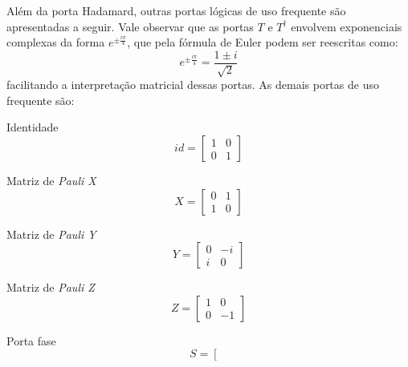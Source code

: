 Além da porta Hadamard, outras portas lógicas de uso frequente são apresentadas a seguir. Vale observar que as portas $T$ e $T^{\dagger}$ envolvem exponenciais complexas da forma $e^{\pm\frac{i\pi}{4}}$, que pela fórmula de Euler podem ser reescritas como:
    $$
        e^{\pm\frac{i\pi}{4}} = \dfrac{1\pm i}{\sqrt{2}}
    $$
\noindent facilitando a interpretação matricial dessas portas. As demais portas de uso frequente são:
    \begin{enumerate}
    \begin{minipage}{0.5\textwidth}
        \item Identidade
        $$
            id=\left[\begin{array}{cc}
                 1 & 0 \\
                 0 & 1
            \end{array}\right]
        $$
    \end{minipage}
    \begin{minipage}{0.5\textwidth}
        \item Matriz de \textit{Pauli X}
        $$
            X=\left[\begin{array}{cc}
                 0 & 1 \\
                 1 & 0
            \end{array}\right]
        $$
    \end{minipage}
    \begin{minipage}{0.5\textwidth}
        \item Matriz de \textit{Pauli Y}
        $$
            Y=\left[\begin{array}{cc}
                 0 & -i \\
                 i & 0
            \end{array}\right]
        $$
    \end{minipage}
    \begin{minipage}{0.5\textwidth}
        \item Matriz de \textit{Pauli Z}
        $$
            Z=\left[\begin{array}{cc}
                 1 & 0 \\
                 0 & -1
            \end{array}\right]
        $$
    \end{minipage}
    \begin{minipage}{0.5\textwidth}
        \item Porta fase
        $$
            S=\left[\begin{array}{cc}

\end{array}$$
\end{minipage}
\end{enumerate}
